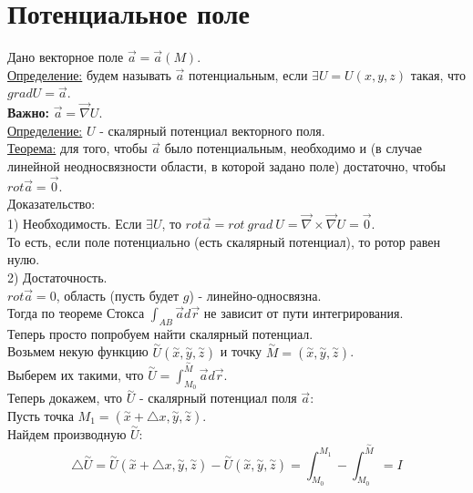 \documentclass[12pt]{article}
\begin{document}
\section{Потенциальное поле}
Дано векторное поле $\overrightarrow{a} = \overrightarrow{a} (M)$.\\
\uline{Определение:} будем называть $\overrightarrow{a}$ потенциальным, если $\exists U = U(x,y,z)$ такая, что $grad U = \overrightarrow{a}$.\\
\textbf{Важно:} $\overrightarrow{a} = \overrightarrow{\nabla} U$.\\
\uline{Определение:} $U$ - скалярный потенциал векторного поля.\\
\uline{Теорема:} для того, чтобы $\overrightarrow{a}$ было потенциальным, необходимо и (в случае линейной неодносвязности области, в которой задано поле) достаточно, чтобы $rot \overrightarrow{a} = \overrightarrow{0}$.\\
Доказательство:\\
1) Необходимость. Если $\exists U$, то $rot \overrightarrow{a} = rot \ grad \ U = \overrightarrow{\nabla} \times \overrightarrow{\nabla} U = \overrightarrow{0}$.\\
То есть, если поле потенциально (есть скалярный потенциал), то ротор равен нулю.\\
2) Достаточность.\\
$rot \overrightarrow{a} = 0$, область (пусть будет $g$) - линейно-односвязна.\\
Тогда по теореме Стокса $\int_{AB} \overrightarrow{a} d \overrightarrow{r}$ не зависит от пути интегрирования.\\
Теперь просто попробуем найти скалярный потенциал.\\
Возьмем некую функцию $\overset{\sim}{U}(\overset{\sim}{x},\overset{\sim}{y},\overset{\sim}{z})$ и точку $\overset{\sim}{M}=(\overset{\sim}{x},\overset{\sim}{y},\overset{\sim}{z})$.\\
Выберем их такими, что $\overset{\sim}{U} = \int_{M_0}^{\overset{\sim}{M}} \overrightarrow{a} d \overrightarrow{r}$.\\
Теперь докажем, что $\overset{\sim}{U}$ - скалярный потенциал поля $\overrightarrow{a}$:\\
Пусть точка $M_1 = (\overset{\sim}{x}+{\bigtriangleup x}, \overset{\sim}{y}, \overset{\sim}{z})$.\\
Найдем производную $\overset{\sim}{U}$:\\
$${\bigtriangleup \overset{\sim}{U}} = \overset{\sim}{U} (\overset{\sim}{x}+{\bigtriangleup x}, \overset{\sim}{y}, \overset{\sim}{z})-\overset{\sim}{U}(\overset{\sim}{x},\overset{\sim}{y},\overset{\sim}{z}) = \int_{M_0}^{M_1} - \int_{M_0}^{\overset{\sim}{M}} = I$$
\end{document}

